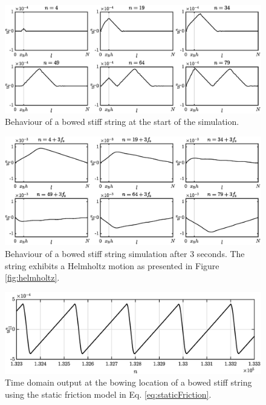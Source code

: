 \begin{figure}[h]
    \centering
    \includegraphics[width=\textwidth]{figures/exciters/bowImplementation.eps}
    \caption{Behaviour of a bowed stiff string at the start of the simulation. \label{fig:staticBowImplementation}}
\end{figure}
\begin{figure}[h]
    \centering
    \includegraphics[width=\textwidth]{figures/exciters/helmholtzState.eps}
    \caption{Behaviour of a bowed stiff string simulation after 3 seconds. The string exhibits a Helmholtz motion as presented in Figure \ref{fig:helmholtz}. \label{fig:helmholtzState}}
\end{figure}
\begin{figure}[h]
    \centering
    \includegraphics[width=\textwidth]{figures/exciters/helmholtzImplementation.eps}
    \caption{Time domain output at the bowing location of a bowed stiff string using the static friction model in Eq. \eqref{eq:staticFriction}. \label{fig:helmholtzImplementation}}
\end{figure}
